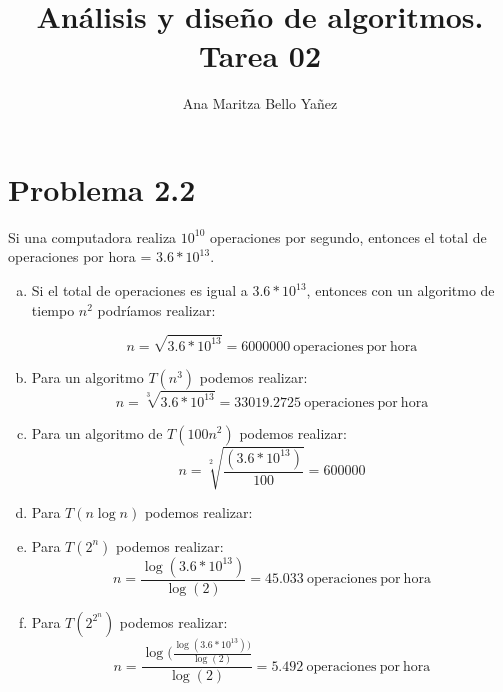 \documentclass{article}
\begin{document}
\title{Análisis y diseño de algoritmos. \\ Tarea 02}
\author{Ana Maritza Bello Yañez}
\maketitle

\section*{Problema 2.2}

Si una computadora realiza $ 10^{10} $ operaciones por segundo, entonces el
total de operaciones por hora = $3.6 * 10^{13} $.

\begin{enumerate}[(a)]
\item Si el total de operaciones es igual a $3.6 * 10^{13} $, entonces con un
algoritmo de tiempo $n^2$ podríamos realizar:

    \begin{equation}
        n = \sqrt{3.6 * 10^{13}} = 6000000 \mathrm{\ operaciones\ por\ hora}
    \end{equation}

\item Para un algoritmo $T(n^3)$ podemos realizar:
    \begin{equation}
        n = \sqrt[3]{3.6 * 10^{13}} = 33019.2725 \mathrm{\ operaciones\ por\ hora}
    \end{equation}

\item Para un algoritmo de $T(100 n^2)$ podemos realizar:
    \begin{equation}
        n = \sqrt[2]{\frac{(3.6 * 10^{13})}{100}} = 600000 
    \end{equation}

\item Para $T(n \log{n})$ podemos realizar:

\item Para $T(2^n)$ podemos realizar:
    \begin{equation}
        n = \frac{\log(3.6 * 10^{13})}{\log(2)} = 45.033 \mathrm{\ operaciones\ por\ hora}
    \end{equation}

\item Para $T(2^{2^n})$ podemos realizar:
    \begin{equation}
        n = \frac{\log(\frac{\log(3.6 * 10^{13}))}{\log(2)}}{\log(2)} = 5.492 \mathrm{\ operaciones\ por\ hora}
    \end{equation}

\end{enumerate}
\end{document}
